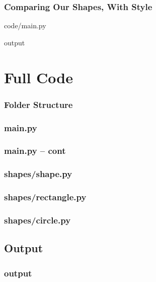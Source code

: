 \documentclass{beamer}
\newcommand{\closenewline}{%
  \par\nopagebreak
  \vspace{-\itemsep}
  \vspace{-\parsep}
}
\begin{document}
  \begin{frame}
    \frametitle{Comparing Our Shapes, With Style}

    code/main.py
    
    \closenewline
    
    \closenewline
    
    \closenewline
    

    output
    
    \closenewline
    
    \closenewline
    
  \end{frame}

\appendix
\section{Full Code}
  \begin{frame}
    \frametitle{Folder Structure}
  \end{frame}

  \begin{frame}
    \frametitle{main.py}
    
  \end{frame}

  \begin{frame}
    \frametitle{main.py -- cont}
    
  \end{frame}

  \begin{frame}
    \frametitle{shapes/shape.py}
    
  \end{frame}

  \begin{frame}
    \frametitle{shapes/rectangle.py}
    
  \end{frame}

  \begin{frame}
    \frametitle{shapes/circle.py}
    
  \end{frame}

\subsection{Output}
  \begin{frame}
    \frametitle{output}
    
  \end{frame}
\end{document}
